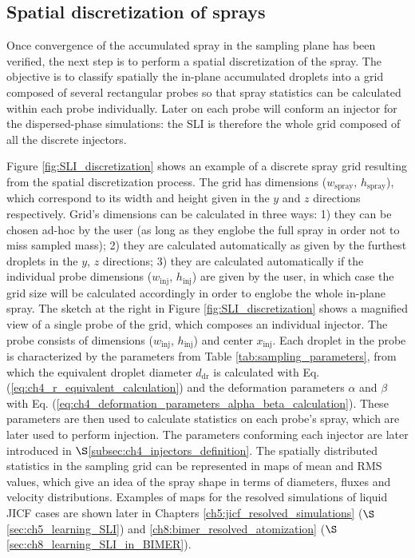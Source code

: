 \subsection{Spatial discretization of sprays}
\label{subsec:SLI_spatial_discretization}

Once convergence of the accumulated spray in the sampling plane has been verified, the next step is to perform a spatial discretization of the spray. The objective is to classify spatially the in-plane accumulated droplets into a grid composed of several rectangular probes so that spray statistics can be calculated within each probe individually. Later on each probe will conform an injector for the dispersed-phase simulations: the SLI is therefore the whole grid composed of all the discrete injectors.

Figure \ref{fig:SLI_discretization} shows an example of a discrete spray grid resulting from the spatial discretization process. The grid has dimensions ($w_\mathrm{spray}$, $h_\mathrm{spray}$), which correspond to its width and height given in the $y$ and $z$ directions respectively. Grid's dimensions can be calculated in three ways: 1) they can be chosen ad-hoc by the user (as long as they englobe the full spray in order not to miss sampled mass); 2) they are calculated automatically as given by the furthest droplets in the $y$, $z$ directions; 3) they are calculated automatically if the individual probe dimensions ($w_\mathrm{inj}$, $h_\mathrm{inj}$) are given by the user, in which case the grid size will be calculated accordingly in order to englobe the whole in-plane spray. The sketch at the right in Figure \ref{fig:SLI_discretization} shows a magnified view of a single probe of the grid, which composes an individual injector. The probe consists of dimensions ($w_\mathrm{inj}$, $h_\mathrm{inj}$) and center $x_\mathrm{inj}$. Each droplet in the probe is characterized by the parameters from Table \ref{tab:sampling_parameters}, from which the equivalent droplet diameter $d_\mathrm{dr}$ is calculated with Eq. (\ref{eq:ch4_r_equivalent_calculation}) and the deformation parameters $\alpha$ and $\beta$ with Eq. (\ref{eq:ch4_deformation_parameters_alpha_beta_calculation}). These parameters are then used to calculate statistics on each probe's spray, which are later used to perform injection. The parameters conforming each injector are later introduced in $\S$\ref{subsec:ch4_injectors_definition}. The spatially distributed statistics in the sampling grid can be represented in maps of mean and RMS values, which give an idea of the spray shape in terms of diameters, fluxes and velocity distributions. Examples of maps for the resolved simulations of liquid JICF cases are shown later in Chapters \ref{ch5:jicf_resolved_simulations} ($\S$\ref{sec:ch5_learning_SLI}) and \ref{ch8:bimer_resolved_atomization} ($\S$\ref{sec:ch8_learning_SLI_in_BIMER}).

